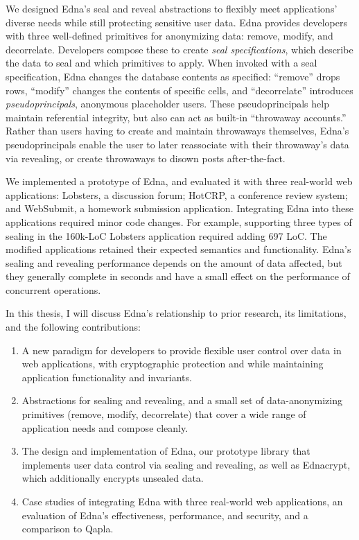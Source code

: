 We designed Edna's seal and reveal abstractions to flexibly meet applications'
diverse needs while still protecting sensitive user data. Edna provides
developers with three well-defined primitives for anonymizing data: remove,
modify, and decorrelate. Developers compose these to create \emph{seal
specifications}, which describe the data to seal and which primitives to apply.
When invoked with a seal specification, Edna changes the database contents as
specified: ``remove'' drops rows, ``modify'' changes the contents of specific
cells, and ``decorrelate'' introduces \emph{pseudoprincipals}, anonymous
placeholder users. These pseudoprincipals help maintain referential integrity,
but also can act as built-in ``throwaway accounts.'' Rather than users having to
create and maintain throwaways themselves, Edna's pseudoprincipals enable the
user to later reassociate with their throwaway's data via revealing, or create
throwaways to disown posts after-the-fact.

We implemented a prototype of Edna, and evaluated it with three real-world web
applications: Lobsters, a discussion forum; HotCRP, a conference review system;
and WebSubmit, a homework submission application. Integrating Edna into these
applications required minor code changes. For example, supporting three types of
sealing in the 160k-LoC Lobsters application required adding 697 LoC. The
modified applications retained their expected semantics and functionality.
Edna's sealing and revealing performance depends on the amount of data affected,
but they generally complete in seconds and have a small effect on the
performance of concurrent operations.

In this thesis, I will discuss Edna's relationship to prior research, its
limitations, and the following contributions:
\begin{enumerate}[nosep] 
    \item A new paradigm for developers to provide flexible user control over data in web applications, with cryptographic protection and while maintaining application functionality and invariants.
    \item Abstractions for sealing and revealing, and a small set of data-anonymizing primitives (remove, modify, decorrelate) that cover a wide range of application needs and compose cleanly.
    \item The design and implementation of Edna, our prototype library that implements user data control via sealing and revealing, as well as Ednacrypt, which additionally encrypts unsealed data.
    \item Case studies of integrating Edna with three real-world web applications, an evaluation of Edna's effectiveness, performance, and security, and a comparison to Qapla.
\end{enumerate}

